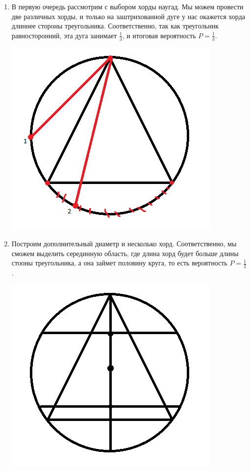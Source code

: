 \documentclass{article}
\begin{document}
\begin{enumerate}
\item В первую очередь рассмотрим с выбором хорды наугад. Мы можем провести две различных хорды, и только на заштрихованной дуге у нас окажется хорда длиннее стороны треугольника. Соответственно, так как треугольник равносторонний, эта дуга занимает $\frac{1}{3}$, и итоговая вероятность $P = \frac{1}{3}$.

\begin{center}
    \includegraphics[scale=0.4]{2.png}
\end{center}

\item Построим дополнительный диаметр и несколько хорд. Соответственно, мы сможем выделить серединную область, где длина хорд будет больше длины стооны треугольника, а она займет половину круга, то есть вероятность $P = \frac{1}{2}$.

\begin{center}
    \includegraphics[scale=0.4]{3.png}
\end{center}


\end{enumerate}
\end{document}

